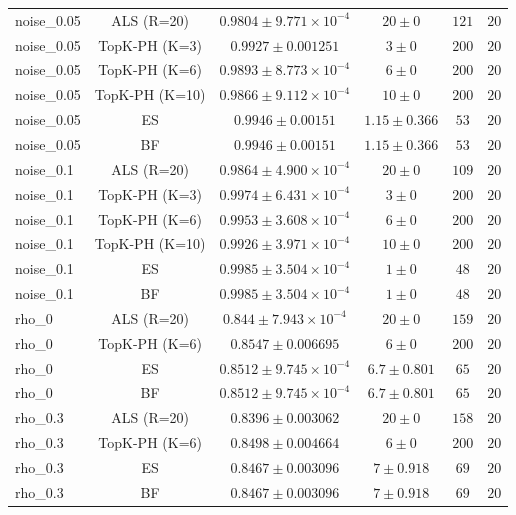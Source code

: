 \begin{longtable}{@{}lccccc@{}}
noise\_0.05 & ALS (R=20) & \(0.9804 \pm 9.771{\times}10^{-4}\) & \(20 \pm 0\) & \(121\) & \(20\) \\
noise\_0.05 & TopK-PH (K=3) & \(0.9927 \pm 0.001251\) & \(3 \pm 0\) & \(200\) & \(20\) \\
noise\_0.05 & TopK-PH (K=6) & \(0.9893 \pm 8.773{\times}10^{-4}\) & \(6 \pm 0\) & \(200\) & \(20\) \\
noise\_0.05 & TopK-PH (K=10) & \(0.9866 \pm 9.112{\times}10^{-4}\) & \(10 \pm 0\) & \(200\) & \(20\) \\
noise\_0.05 & ES & \(0.9946 \pm 0.00151\) & \(1.15 \pm 0.366\) & \(53\) & \(20\) \\
noise\_0.05 & BF & \(0.9946 \pm 0.00151\) & \(1.15 \pm 0.366\) & \(53\) & \(20\) \\
noise\_0.1 & ALS (R=20) & \(0.9864 \pm 4.900{\times}10^{-4}\) & \(20 \pm 0\) & \(109\) & \(20\) \\
noise\_0.1 & TopK-PH (K=3) & \(0.9974 \pm 6.431{\times}10^{-4}\) & \(3 \pm 0\) & \(200\) & \(20\) \\
noise\_0.1 & TopK-PH (K=6) & \(0.9953 \pm 3.608{\times}10^{-4}\) & \(6 \pm 0\) & \(200\) & \(20\) \\
noise\_0.1 & TopK-PH (K=10) & \(0.9926 \pm 3.971{\times}10^{-4}\) & \(10 \pm 0\) & \(200\) & \(20\) \\
noise\_0.1 & ES & \(0.9985 \pm 3.504{\times}10^{-4}\) & \(1 \pm 0\) & \(48\) & \(20\) \\
noise\_0.1 & BF & \(0.9985 \pm 3.504{\times}10^{-4}\) & \(1 \pm 0\) & \(48\) & \(20\) \\
rho\_0 & ALS (R=20) & \(0.844 \pm 7.943{\times}10^{-4}\) & \(20 \pm 0\) & \(159\) & \(20\) \\
rho\_0 & TopK-PH (K=6) & \(0.8547 \pm 0.006695\) & \(6 \pm 0\) & \(200\) & \(20\) \\
rho\_0 & ES & \(0.8512 \pm 9.745{\times}10^{-4}\) & \(6.7 \pm 0.801\) & \(65\) & \(20\) \\
rho\_0 & BF & \(0.8512 \pm 9.745{\times}10^{-4}\) & \(6.7 \pm 0.801\) & \(65\) & \(20\) \\
rho\_0.3 & ALS (R=20) & \(0.8396 \pm 0.003062\) & \(20 \pm 0\) & \(158\) & \(20\) \\
rho\_0.3 & TopK-PH (K=6) & \(0.8498 \pm 0.004664\) & \(6 \pm 0\) & \(200\) & \(20\) \\
rho\_0.3 & ES & \(0.8467 \pm 0.003096\) & \(7 \pm 0.918\) & \(69\) & \(20\) \\
rho\_0.3 & BF & \(0.8467 \pm 0.003096\) & \(7 \pm 0.918\) & \(69\) & \(20\) \\

\end{longtable}
